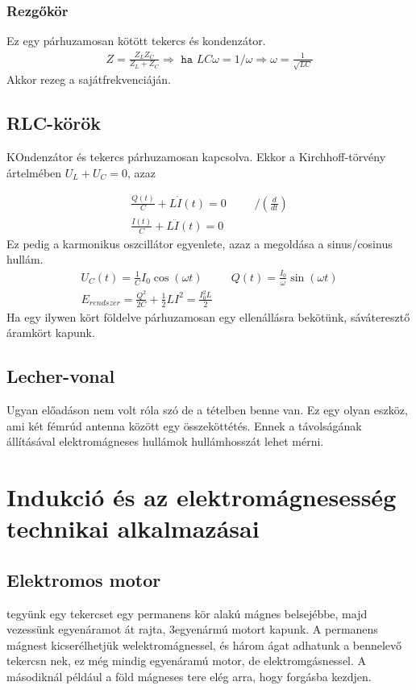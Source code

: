 \documentclass{article}
\begin{document}
\subsubsection{Rezgőkör}
Ez egy párhuzamosan kötött tekercs és kondenzátor.
\begin{gather*}
Z=\frac{Z_L Z_C}{Z_L +Z_C} \Rightarrow \texttt{ ha } LC\omega = 1/\omega \Rightarrow \omega = \frac{1}{\sqrt{LC}}
\end{gather*}
Akkor rezeg a sajátfrekvenciáján.
\subsection{RLC-körök}
KOndenzátor és tekercs párhuzamosan kapcsolva. Ekkor a Kirchhoff-törvény ártelmében $U_L + U_C = 0$, azaz

\begin{gather*}
\frac{Q(t)}{C} + L\dot{I}(t) = 0 \hspace{30pt} /(\frac{d}{dt})\\ 
\frac{I(t)}{C} + L\ddot{I}(t) = 0
\end{gather*} Ez pedig a karmonikus oszcillátor egyenlete, azaz a megoldása a sinus/cosinus hullám.
\begin{gather*}
U_C(t) = \frac{1}{C} I_0 \cos(\omega t) \hspace{30pt} Q(t) = \frac{I_0}{\omega} \sin(\omega t) \\
E_{rendszer} = \frac{Q^2}{2C} + \frac{1}{2}LI^2 = \frac{I_0^2 L }{2}
\end{gather*}
Ha egy ilywen kört földelve párhuzamosan egy ellenállásra bekötünk, sáváteresztő áramkört kapunk.
\subsection{Lecher-vonal}
Ugyan előadáson nem volt róla szó de a tételben benne van. Ez egy olyan eszköz, ami két fémrúd antenna között egy összeköttétés. Ennek a távolságának állításával elektromágneses hullámok hullámhosszát lehet mérni.
\newpage
\section{Indukció és az elektromágnesesség technikai alkalmazásai}
\subsection{Elektromos motor}
tegyünk egy tekercset egy permanens kör alakú mágnes belsejébbe, majd vezessünk egyenáramot át rajta, 3egyenármú motort kapunk. A permanens mágnest kicserélhetjük welektromágnessel, és három ágat adhatunk a bennelevő tekercsn nek, ez még mindig egyenáramú motor, de elektromgásnessel. A másodiknál például a föld mágneses tere elég arra, hogy forgásba kezdjen.
\end{document}
